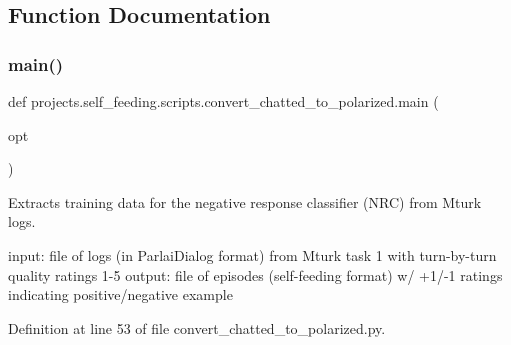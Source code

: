 \subsection{Function Documentation}
\mbox{\label{namespaceprojects_1_1self__feeding_1_1scripts_1_1convert__chatted__to__polarized_ac770e55a3dab688df1d4df65d7d5263b}} 
\subsubsection{\texorpdfstring{main()}{main()}}
{\footnotesize\ttfamily def projects.\+self\+\_\+feeding.\+scripts.\+convert\+\_\+chatted\+\_\+to\+\_\+polarized.\+main (\begin{DoxyParamCaption}\item[{}]{opt }\end{DoxyParamCaption})}

\begin{DoxyVerb}Extracts training data for the negative response classifier (NRC) from Mturk logs.

input: file of logs (in ParlaiDialog format) from Mturk task 1 with turn-by-turn
    quality ratings 1-5
output: file of episodes (self-feeding format) w/ +1/-1 ratings indicating
    positive/negative example
\end{DoxyVerb}
 

Definition at line 53 of file convert\+\_\+chatted\+\_\+to\+\_\+polarized.\+py.


